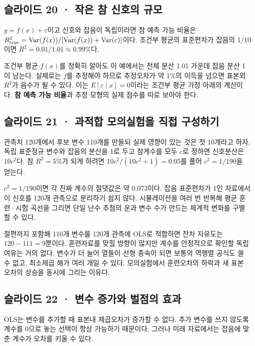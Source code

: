 \documentclass[11pt,a4paper]{article}
\begin{document}
\subsection{슬라이드 20 · 작은 참 신호의 규모}
$y=f(x)+\varepsilon$이고 신호와 잡음이 독립이라면 참 예측 가능 비율은 $R^2_{\rm true}=\operatorname{Var}(f(x))/[\operatorname{Var}(f(x))+\operatorname{Var}(\varepsilon)]$이다. 조건부 평균의 표준편차가 잡음의 1/10이면 $R^2=0.01/1.01\approx0.99\%$다.\par

조건부 평균 $f(x)$를 정확히 알아도 이 예에서는 전체 분산 1.01 가운데 잡음 분산 1이 남는다. 실제로는 $f$를 추정해야 하므로 추정오차가 약 1\%의 이득을 넘으면 표본외 $R^2$가 음수가 될 수 있다. 이는 $E[\varepsilon\mid x]=0$이라는 조건부 평균 가정 아래의 계산이다. \textbf{참 예측 가능 비율}과 추정 모형의 실제 점수를 따로 보아야 한다.\par

\subsection{슬라이드 21 · 과적합 모의실험을 직접 구성하기}
관측치 120개에서 후보 변수 110개를 만들되 실제 영향이 있는 것은 첫 10개라고 하자. 독립 표준정규 변수와 잡음의 분산을 1로 두고 참계수를 모두 $c$로 정하면 신호분산은 $10c^2$다. 참 $R^2=5\%$가 되게 하려면 $10c^2/(10c^2+1)=0.05$를 풀어 $c^2=1/190$을 얻는다.\par

$c^2=1/190$이면 각 진짜 계수의 절댓값은 약 $0.073$이다. 잡음 표준편차가 1인 자료에서 이 신호를 120개 관측으로 분리하기 쉽지 않다. 시뮬레이션을 여러 번 반복해 평균 훈련·시험 곡선을 그리면 단일 난수 추첨의 운과 변수 수가 만드는 체계적 변화를 구별할 수 있다.\par

절편까지 포함해 110개 변수를 120개 관측에 OLS로 적합하면 잔차 자유도는 $120-111=9$뿐이다. 훈련자료를 맞힐 방향이 많지만 계수를 안정적으로 확인할 독립 여유는 거의 없다. 변수가 더 늘어 열들이 선형 종속이 되면 보통의 역행렬 공식도 쓸 수 없고, 최소제곱 해가 여러 개일 수 있다. 모의실험에서 훈련오차의 하락과 새 표본 오차의 상승을 동시에 그리는 이유다.\par

\subsection{슬라이드 22 · 변수 증가와 벌점의 효과}
OLS는 변수를 추가할 때 표본내 제곱오차가 증가할 수 없다. 추가 변수를 쓰지 않도록 계수를 0으로 놓는 선택이 항상 가능하기 때문이다. 그러나 미래 자료에서는 잡음에 맞춘 계수가 오차를 키울 수 있다.\par
\end{document}
